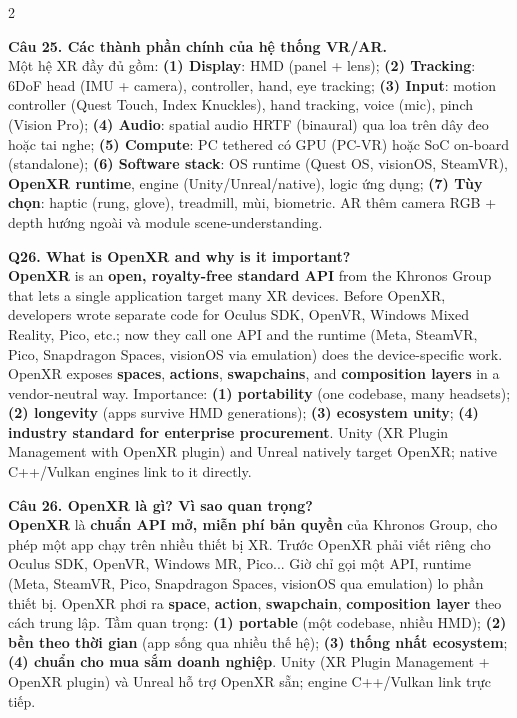 \begin{paracol}{2}
\switchcolumn

\textbf{Câu 25. Các thành phần chính của hệ thống VR/AR.}\\
Một hệ XR đầy đủ gồm: \textbf{(1) Display}: HMD (panel + lens); \textbf{(2) Tracking}: 6DoF head (IMU + camera), controller, hand, eye tracking; \textbf{(3) Input}: motion controller (Quest Touch, Index Knuckles), hand tracking, voice (mic), pinch (Vision Pro); \textbf{(4) Audio}: spatial audio HRTF (binaural) qua loa trên dây đeo hoặc tai nghe; \textbf{(5) Compute}: PC tethered có GPU (PC-VR) hoặc SoC on-board (standalone); \textbf{(6) Software stack}: OS runtime (Quest OS, visionOS, SteamVR), \textbf{OpenXR runtime}, engine (Unity/Unreal/native), logic ứng dụng; \textbf{(7) Tùy chọn}: haptic (rung, glove), treadmill, mùi, biometric. AR thêm camera RGB + depth hướng ngoài và module scene-understanding.

\switchcolumn*

\textbf{Q26. What is OpenXR and why is it important?}\\
\textbf{OpenXR} is an \textbf{open, royalty-free standard API} from the Khronos Group that lets a single application target many XR devices. Before OpenXR, developers wrote separate code for Oculus SDK, OpenVR, Windows Mixed Reality, Pico, etc.; now they call one API and the runtime (Meta, SteamVR, Pico, Snapdragon Spaces, visionOS via emulation) does the device-specific work. OpenXR exposes \textbf{spaces}, \textbf{actions}, \textbf{swapchains}, and \textbf{composition layers} in a vendor-neutral way. Importance: \textbf{(1) portability} (one codebase, many headsets); \textbf{(2) longevity} (apps survive HMD generations); \textbf{(3) ecosystem unity}; \textbf{(4) industry standard for enterprise procurement}. Unity (XR Plugin Management with OpenXR plugin) and Unreal natively target OpenXR; native C++/Vulkan engines link to it directly.

\switchcolumn

\textbf{Câu 26. OpenXR là gì? Vì sao quan trọng?}\\
\textbf{OpenXR} là \textbf{chuẩn API mở, miễn phí bản quyền} của Khronos Group, cho phép một app chạy trên nhiều thiết bị XR. Trước OpenXR phải viết riêng cho Oculus SDK, OpenVR, Windows MR, Pico... Giờ chỉ gọi một API, runtime (Meta, SteamVR, Pico, Snapdragon Spaces, visionOS qua emulation) lo phần thiết bị. OpenXR phơi ra \textbf{space}, \textbf{action}, \textbf{swapchain}, \textbf{composition layer} theo cách trung lập. Tầm quan trọng: \textbf{(1) portable} (một codebase, nhiều HMD); \textbf{(2) bền theo thời gian} (app sống qua nhiều thế hệ); \textbf{(3) thống nhất ecosystem}; \textbf{(4) chuẩn cho mua sắm doanh nghiệp}. Unity (XR Plugin Management + OpenXR plugin) và Unreal hỗ trợ OpenXR sẵn; engine C++/Vulkan link trực tiếp.


\end{paracol}
